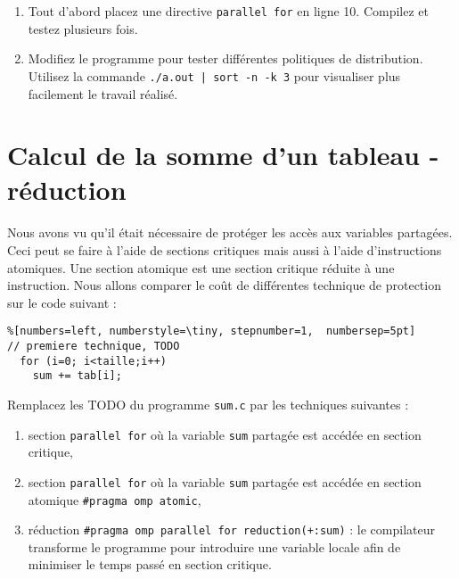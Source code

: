 \documentclass[A4wide]{article}
\begin{document}
\begin{enumerate}
\item Tout d'abord placez une directive \verb#parallel for# en ligne 10. Compilez et 
testez plusieurs fois. 

\item Modifiez le programme pour tester différentes politiques de
  distribution.  Utilisez la commande \verb#./a.out | sort -n -k 3#
  pour visualiser plus facilement le travail réalisé.
\end{enumerate}


\section{Calcul de la somme d'un tableau - réduction}

Nous avons vu qu'il était nécessaire de protéger les accès aux
variables partagées. Ceci peut se faire à l'aide de sections critiques
mais aussi à l'aide d'instructions atomiques. Une section atomique est
une section critique réduite à une instruction. Nous allons comparer
le coût de différentes technique de protection sur le code suivant :

\begin{lstlisting}%[numbers=left, numberstyle=\tiny, stepnumber=1,  numbersep=5pt]
// premiere technique, TODO 
  for (i=0; i<taille;i++) 
    sum += tab[i];
\end{lstlisting}

Remplacez les TODO du programme \verb#sum.c#  par les techniques
suivantes :

\begin{enumerate}
\item section \verb#parallel for# où la variable \verb#sum# partagée
  est accédée en section critique,
\item section \verb#parallel for# où la variable \verb#sum# partagée
  est accédée en section atomique \verb&#pragma omp atomic&,
\item réduction \verb&#pragma omp parallel for reduction(+:sum)& : le
  compilateur transforme le programme pour introduire une variable
  locale afin de minimiser le temps passé en section critique.
\end{enumerate}
\end{document}
